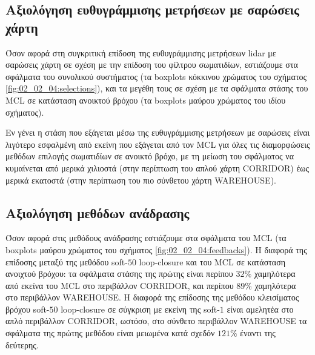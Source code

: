 \subsection{Αξιολόγηση ευθυγράμμισης μετρήσεων με σαρώσεις χάρτη}

Όσον αφορά στη συγκριτική επίδοση της ευθυγράμμισης μετρήσεων lidar με σαρώσεις
χάρτη σε σχέση με την επίδοση του φίλτρου σωματιδίων, εστιάζουμε στα σφάλματα
του συνολικού συστήματος (τα boxplots κόκκινου χρώματος του σχήματος
\ref{fig:02_02_04:selections}), και τα μεγέθη τους σε σχέση με τα σφάλματα
στάσης του MCL σε κατάσταση ανοικτού βρόχου (τα boxplots μαύρου χρώματος του
ιδίου σχήματος).

Εν γένει η στάση που εξάγεται μέσω της ευθυγράμμισης μετρήσεων με σαρώσεις
είναι λιγότερο εσφαλμένη από εκείνη που εξάγεται από τον MCL για όλες τις
διαμορφώσεις μεθόδων επιλογής σωματιδίων σε ανοικτό βρόχο, με τη μείωση του
σφάλματος να κυμαίνεται από μερικά χιλιοστά (στην περίπτωση του απλού χάρτη
CORRIDOR) έως μερικά εκατοστά (στην περίπτωση του πιο σύνθετου χάρτη
WAREHOUSE).

\subsection{Αξιολόγηση μεθόδων ανάδρασης}

Όσον αφορά στις μεθόδους ανάδρασης εστιάζουμε στα σφάλματα του MCL (τα
boxplots μαύρου χρώματος του σχήματος \ref{fig:02_02_04:feedbacks}). Η διαφορά
της επίδοσης μεταξύ της μεθόδου soft-$50$ loop-closure και του MCL σε κατάσταση
ανοιχτού βρόχου: τα σφάλματα στάσης της πρώτης είναι περίπου $32\%$ χαμηλότερα
από εκείνα του MCL στο περιβάλλον CORRIDOR, και περίπου $89\%$ χαμηλότερα στο
περιβάλλον WAREHOUSE. Η διαφορά της επίδοσης της μεθόδου κλεισίματος βρόχου
soft-$50$ loop-closure σε σύγκριση με εκείνη της soft-$1$ είναι αμελητέα στο
απλό περιβάλλον CORRIDOR, ωστόσο, στο σύνθετο περιβάλλον WAREHOUSE τα σφάλματα
της πρώτης μεθόδου είναι μειωμένα κατά σχεδόν $121\%$ έναντι της δεύτερης.

